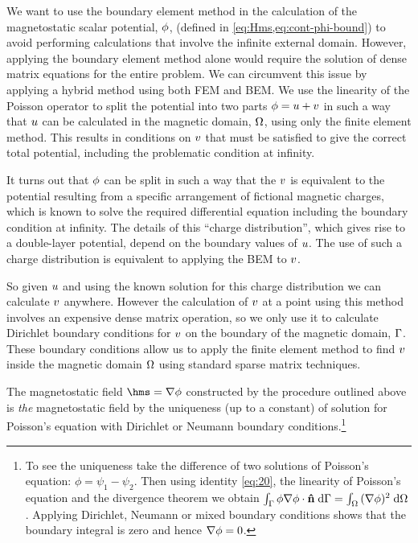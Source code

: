We want to use the boundary element method in the calculation of the magnetostatic scalar potential, $\phi$, (defined in \cref{eq:Hms,eq:cont-phi-bound}) to avoid performing calculations that involve the infinite external domain.
However, applying the boundary element method alone would require the solution of dense matrix equations for the entire problem.
We can circumvent this issue by applying a hybrid method using both FEM and BEM.
We use the linearity of the Poisson operator to split the potential into two parts $\phi = u + v$ in such a way that $u$ can be calculated in the magnetic domain, $\Omega$, using only the finite element method.
This results in conditions on $v$ that must be satisfied to give the correct total potential, including the problematic condition at infinity.

It turns out that $\phi$ can be split in such a way that the $v$ is equivalent to the potential resulting from a specific arrangement of fictional magnetic charges, which is known to solve the required differential equation including the boundary condition at infinity.
The details of this ``charge distribution'', which gives rise to a double-layer potential, depend on the boundary values of $u$.
The use of such a charge distribution is equivalent to applying the BEM to $v$.

So given $u$ and using the known solution for this charge distribution we can calculate $v$ anywhere.
However the calculation of $v$ at a point using this method involves an expensive dense matrix operation, so we only use it to calculate Dirichlet boundary conditions for $v$ on the boundary of the magnetic domain, ${\Gamma}$.
These boundary conditions allow us to apply the finite element method to find $v$ inside the magnetic domain $\Omega$ using standard sparse matrix techniques.

The magnetostatic field $ \hms = \grad \phim$ constructed by the procedure outlined above is \emph{the} magnetostatic field by the uniqueness (up to a constant) of solution for Poisson's equation with Dirichlet or Neumann boundary conditions.\footnote{To see the uniqueness take the difference of two solutions of Poisson's equation: $\phi = \psi_1 - \psi_2$.
Then using identity \cref{eq:20}, the linearity of Poisson's equation and the divergence theorem we obtain ${\int_{{\Gamma}} {\phi \nabla \phi \cdot \boldsymbol{\mathrm{\hat{n}}}} {\; \mathrm{{d}}} {{\Gamma}}} = {\int_{\Omega} {(\nabla \phi)^2 } {\; \mathrm{{d}}} {\Omega}}$.
Applying Dirichlet, Neumann or mixed boundary conditions shows that the boundary integral is zero and hence $\nabla \phi = 0$.}

